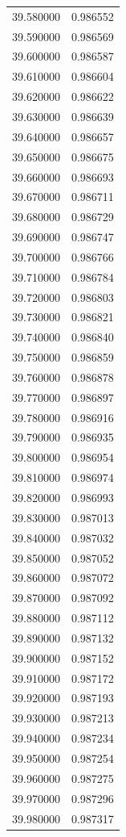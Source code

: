 \begin{tabular}{rr}
39.580000 & 0.986552 \\
39.590000 & 0.986569 \\
39.600000 & 0.986587 \\
39.610000 & 0.986604 \\
39.620000 & 0.986622 \\
39.630000 & 0.986639 \\
39.640000 & 0.986657 \\
39.650000 & 0.986675 \\
39.660000 & 0.986693 \\
39.670000 & 0.986711 \\
39.680000 & 0.986729 \\
39.690000 & 0.986747 \\
39.700000 & 0.986766 \\
39.710000 & 0.986784 \\
39.720000 & 0.986803 \\
39.730000 & 0.986821 \\
39.740000 & 0.986840 \\
39.750000 & 0.986859 \\
39.760000 & 0.986878 \\
39.770000 & 0.986897 \\
39.780000 & 0.986916 \\
39.790000 & 0.986935 \\
39.800000 & 0.986954 \\
39.810000 & 0.986974 \\
39.820000 & 0.986993 \\
39.830000 & 0.987013 \\
39.840000 & 0.987032 \\
39.850000 & 0.987052 \\
39.860000 & 0.987072 \\
39.870000 & 0.987092 \\
39.880000 & 0.987112 \\
39.890000 & 0.987132 \\
39.900000 & 0.987152 \\
39.910000 & 0.987172 \\
39.920000 & 0.987193 \\
39.930000 & 0.987213 \\
39.940000 & 0.987234 \\
39.950000 & 0.987254 \\
39.960000 & 0.987275 \\
39.970000 & 0.987296 \\
39.980000 & 0.987317 \\

\end{tabular}
